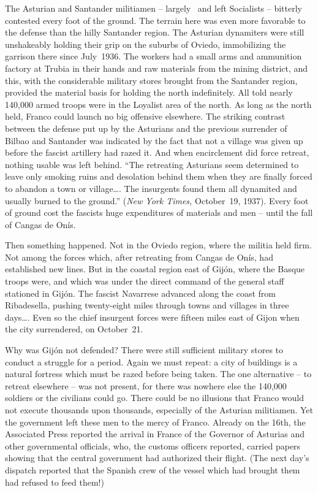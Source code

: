The Asturian and Santander militiamen – largely \CNT\ and left Socialists – bitterly contested every foot of the ground. The terrain here was even more favorable to the defense than the hilly Santander region. The Asturian dynamiters were still unshakeably holding their grip on the suburbs of Oviedo, immobilizing the garrison there since July~1936. The workers had a small arms and ammunition factory at Trubia in their hands and raw materials from the mining district, and this, with the considerable military stores brought from the Santander region, provided the material basis for holding the north indefinitely. All told nearly 140,000 armed troops were in the Loyalist area of the north. As long as the north held, Franco could launch no big offensive elsewhere. The striking contrast between the defense put up by the Asturians and the previous surrender of Bilbao and Santander was indicated by the fact that not a village was given up before the fascist artillery had razed it. And when encirclement did force retreat, nothing usable was left behind. ``The retreating Asturians seem determined to leave only smoking ruins and desolation behind them when they are finally forced to abandon a town or village\dots. The insurgents found them all dynamited and usually burned to the ground.'' (\emph{New York Times,} October~19, 1937). Every foot of ground cost the fascists huge expenditures of materials and men – until the fall of Cangas de On\'is.

Then something happened. Not in the Oviedo region, where the militia held firm. Not among the forces which, after retreating from Cangas de On\'is, had established new lines. But in the coastal region east of Gij\'on, where the Basque troops were, and which was under the direct command of the general staff stationed in Gij\'on. The fascist Navarrese advanced along the coast from Ribadesella, pushing twenty-eight miles through towns and villages in three days\dots. Even so the chief insurgent forces were fifteen miles east of Gijon when the city surrendered, on October~21.

Why was Gij\'on not defended? There were still sufficient military stores to conduct a struggle for a period. Again we must repeat: a city of buildings is a natural fortress which must be razed before being taken. The one alternative – to retreat elsewhere – was not present, for there was nowhere else the 140,000 soldiers or the civilians could go. There could be no illusions that Franco would not execute thousands upon thousands, especially of the Asturian militiamen. Yet the government left these men to the mercy of Franco. Already on the 16th, the Associated Press reported the arrival in France of the Governor of Asturias and other governmental officials, who, the customs officers reported, carried papers showing that the central government had authorized their flight. (The next day’s dispatch reported that the Spanish crew of the vessel which had brought them had refused to feed them!)

